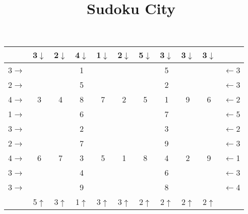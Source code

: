 \documentclass[12pt]{amsart}
\theoremstyle{definition}
\begin{document}
\title{Sudoku City}


\maketitle

\thispagestyle{empty}




\begin{center}\Large
\begin{tabular}{c||c|c|c||c|c|c||c|c|c||c}
  & 3\(\downarrow\) & 2\(\downarrow\) & 4\(\downarrow\) & 1\(\downarrow\) & 2\(\downarrow\) & 5\(\downarrow\) & 3\(\downarrow\) & 3\(\downarrow\) & 3\(\downarrow\) &   \\\hline\hline
3\(\rightarrow\) &   & \color{mygray}{$\clubsuit$} & 1 &   &   &   & 5 &   &   & \(\leftarrow\)3 \\\hline
2\(\rightarrow\) &   &   & 5 &   & \color{mygray}{$\heartsuit$} &   & 2 &   & \color{mygray}{$\clubsuit$} & \(\leftarrow\)3 \\\hline
4\(\rightarrow\) & 3 & 4 & 8 & 7 & 2 & 5 & 1 & 9 & 6 & \(\leftarrow\)2 \\\hline\hline
1\(\rightarrow\) &   &   & 6 & \color{mygray}{$\clubsuit$} &   &   & 7 &   &   & \(\leftarrow\)5 \\\hline
3\(\rightarrow\) & \color{mygray}{$\diamondsuit$} &   & 2 & \color{mygray}{$\heartsuit$} &   & \color{mygray}{$\spadesuit$} & 3 & \color{mygray}{$\nabla$} &   & \(\leftarrow\)2 \\\hline
2\(\rightarrow\) &   & \color{mygray}{$\star$} & 7 &   &   &   & 9 &   & \color{mygray}{$\diamondsuit$} & \(\leftarrow\)3 \\\hline\hline
4\(\rightarrow\) & 6 & 7 & 3 & 5 & 1 & 8 & 4 & 2 & 9 & \(\leftarrow\)1 \\\hline
3\(\rightarrow\) &   & \color{mygray}{$\heartsuit$} & 4 &   & \color{mygray}{$\nabla$} &   & 6 & \color{mygray}{$\spadesuit$} &   & \(\leftarrow\)3 \\\hline
3\(\rightarrow\) &   &   & 9 &   &   & \color{mygray}{$\diamondsuit$} & 8 &   &   & \(\leftarrow\)4 \\\hline\hline
  & 5\(\uparrow\) & 3\(\uparrow\) & 1\(\uparrow\) & 3\(\uparrow\) & 3\(\uparrow\) & 2\(\uparrow\) & 2\(\uparrow\) & 2\(\uparrow\) & 2\(\uparrow\) &
\end{tabular}
\end{center}

\vspace{.5in}
\end{document}
